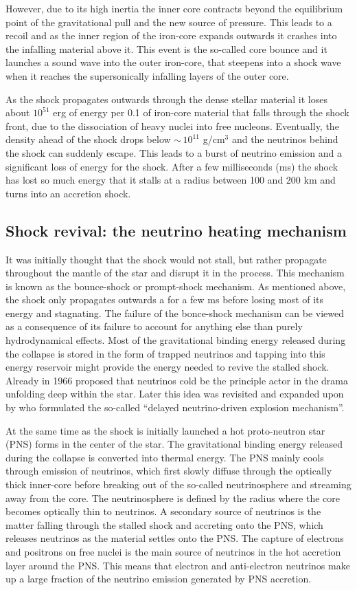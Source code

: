 However, due to its high inertia the inner core contracts beyond the equilibrium point of the
gravitational pull and the new source of pressure. This leads to a recoil and as the inner region of the iron-core expands outwards it crashes
into the infalling material above it. This event is the so-called core bounce and it launches a sound wave into the outer iron-core, that steepens into a shock wave when it reaches the supersonically infalling layers of the outer core.

As the shock propagates outwards through the dense stellar material it loses about 
$10^{51}$ erg of energy per 0.1 \msun of iron-core material that falls through the shock front, 
due to the dissociation of heavy nuclei into free nucleons.
Eventually, the density ahead of the shock drops below $\sim \, 10^{11}$ g/cm$^3$ and
the neutrinos behind the shock can suddenly escape. This leads to a burst of neutrino emission and a significant loss of energy for the shock. After a few milliseconds (ms) the
shock has lost so much energy that it stalls at a radius between 100 and 200 km
and turns into an accretion shock.

\subsection{Shock revival: the neutrino heating mechanism}
It was initially thought that the shock would not stall, but rather propagate
throughout the mantle of the star and disrupt it in the process. 
This mechanism is known as the bounce-shock or prompt-shock mechanism.
As mentioned above, the shock only propagates outwards a for a few ms before losing most of its
energy and stagnating. The failure of the bonce-shock mechanism
can be viewed as a consequence of its failure to account for anything else than purely hydrodynamical effects. Most of the gravitational binding energy released during the collapse is stored in
the form of trapped neutrinos and tapping into this energy reservoir might provide the energy needed to revive the stalled shock.
Already in 1966 \cite{colgate_66} proposed that neutrinos cold be the principle
actor in the drama unfolding deep within the star. Later this idea was revisited and expanded upon by \cite{wilson_85}
who formulated the so-called ``delayed neutrino-driven explosion mechanism''.

At the same time as the shock is initially launched a hot proto-neutron star (PNS)
forms in the center of the star. The gravitational binding energy released during the collapse is converted into thermal energy. The PNS mainly cools
through emission of neutrinos, which first slowly diffuse through the optically thick inner-core
before breaking out of the so-called neutrinosphere and streaming away from the core.
The neutrinosphere is defined by the radius where the core becomes optically thin to neutrinos.
A secondary source of neutrinos is the matter falling through the stalled shock and accreting onto the PNS, 
which releases neutrinos as the material settles onto the PNS. The capture of electrons and positrons on free nuclei is the main source of neutrinos in the hot accretion layer
around the PNS. This means that electron and anti-electron neutrinos make up a large fraction of the neutrino emission generated by PNS accretion. 

